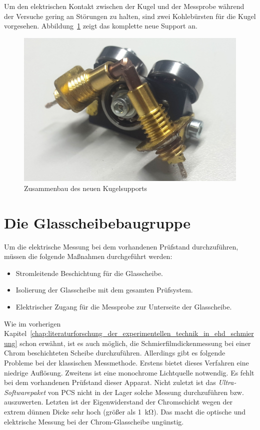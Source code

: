 Um den elektrischen Kontakt zwischen der Kugel und der Messprobe während der Versuche gering an Störungen zu halten, sind zwei Kohlebürsten für die Kugel vorgesehen.
Abbildung~\ref{fig:das_komplette_kugelsupports} zeigt das komplette neue Support an.

\begin{figure}[htb]
    \centering
    \includegraphics[width=0.5\linewidth]{./images/kugelsupport_full.jpg}
    \caption{Zusammenbau des neuen Kugelsupports}
    \label{fig:das_komplette_kugelsupports}
\end{figure}

\section{Die Glasscheibebaugruppe}
\label{sec:die_glasscheibebaugruppe}

Um die elektrische Messung bei dem vorhandenen Prüfstand durchzuführen, müssen die folgende Maßnahmen durchgeführt werden:
\begin{itemize}
    \item Stromleitende Beschichtung für die Glasscheibe.
    \item Isolierung der Glasscheibe mit dem gesamten Prüfsystem.
    \item Elektrischer Zugang für die Messprobe zur Unterseite der Glasscheibe.
\end{itemize}

Wie im vorherigen Kapitel~\ref{chap:literaturforschung_der_experimentellen_technik_in_ehd_schmierung} schon erwähnt, ist es auch möglich, die Schmierfilmdickenmessung bei einer Chrom beschichteten Scheibe durchzuführen.
Allerdings gibt es folgende Probleme bei der klassischen Messmethode.
Erstens bietet dieses Verfahren eine niedrige Auflösung.
Zweitens ist eine monochrome Lichtquelle notwendig.
Es fehlt bei dem vorhandenen Prüfstand dieser Apparat.
Nicht zuletzt ist das \textit{Ultra-Softwarepaket} von PCS nicht in der Lager solche Messung durchzuführen bzw. auszuwerten.
Letzten ist der Eigenwiderstand der Chromschicht wegen der extrem dünnen Dicke sehr hoch (größer als \SI{1}{\kilo\ohm}).
Das macht die optische und elektrische Messung bei der Chrom-Glasscheibe ungünstig.

